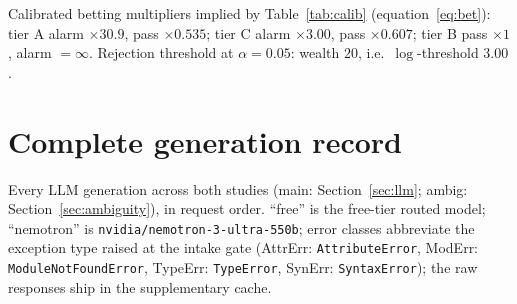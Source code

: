 \documentclass[pdflatex,sn-mathphys-num]{sn-jnl}
\theoremstyle{thmstyleone}
\theoremstyle{thmstyletwo}
\begin{document}
\begin{appendices}
Calibrated betting multipliers implied by Table~\ref{tab:calib}
(equation~\eqref{eq:bet}): tier A alarm $\times 30.9$, pass
$\times 0.535$; tier C alarm $\times 3.00$, pass $\times 0.607$;
tier B pass $\times 1$, alarm $= \infty$. Rejection threshold at
$\alpha = 0.05$: wealth $20$, i.e.\ $\log$-threshold $3.00$.

\section{Complete generation record}\label{app:genrecord}

Every LLM generation across both studies (main: Section~\ref{sec:llm};
ambig: Section~\ref{sec:ambiguity}), in request order. ``free'' is
the free-tier routed model; ``nemotron'' is
\texttt{nvidia/nemotron-3-ultra-550b}; error classes abbreviate the
exception type raised at the intake gate (AttrErr:
\texttt{AttributeError}, ModErr: \texttt{ModuleNotFoundError},
TypeErr: \texttt{TypeError}, SynErr: \texttt{SyntaxError}); the raw
responses ship in the supplementary cache.


\end{appendices}
\end{document}
